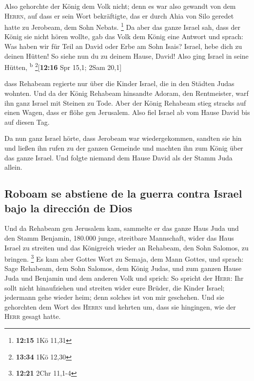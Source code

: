  Also gehorchte der König dem Volk nicht; denn es war
also gewandt von dem \textsc{Herrn}, auf dass er sein Wort bekräftigte,
das er durch Ahia von Silo geredet hatte zu Jerobeam, dem Sohn Nebats.
\footnote{\textbf{12:15} 1Kö 11,31}  Da aber das ganze
Israel sah, dass der König sie nicht hören wollte, gab das Volk dem
König eine Antwort und sprach: Was haben wir für Teil an David oder Erbe
am Sohn Isais? Israel, hebe dich zu deinen Hütten! So siehe nun du zu
deinem Hause, David! Also ging Israel in seine Hütten,
\textsuperscript{b} \footnote{\textbf{13:34} 1Kö 12,30}{[}\textbf{12:16}
Spr 15,1; 2Sam 20,1{]}

 dass Rehabeam regierte nur über die Kinder Israel, die
in den Städten Judas wohnten.  Und da der König Rehabeam
hinsandte Adoram, den Rentmeister, warf ihn ganz Israel mit Steinen zu
Tode. Aber der König Rehabeam stieg stracks auf einen Wagen, dass er
flöhe gen Jerusalem.  Also fiel Israel ab vom Hause David
bis auf diesen Tag.

 Da nun ganz Israel hörte, dass Jerobeam war
wiedergekommen, sandten sie hin und ließen ihn rufen zu der ganzen
Gemeinde und machten ihn zum König über das ganze Israel. Und folgte
niemand dem Hause David als der Stamm Juda allein.

\hypertarget{roboam-se-abstiene-de-la-guerra-contra-israel-bajo-la-direcciuxf3n-de-dios}{%
\subsection{Roboam se abstiene de la guerra contra Israel bajo la
dirección de
Dios}\label{roboam-se-abstiene-de-la-guerra-contra-israel-bajo-la-direcciuxf3n-de-dios}}

 Und da Rehabeam gen Jerusalem kam, sammelte er das ganze
Haus Juda und den Stamm Benjamin, 180.000 junge, streitbare Mannschaft,
wider das Haus Israel zu streiten und das Königreich wieder an Rehabeam,
den Sohn Salomos, zu bringen. \footnote{\textbf{12:21} 2Chr 11,1-4}
 Es kam aber Gottes Wort zu Semaja, dem Mann Gottes, und
sprach:  Sage Rehabeam, dem Sohn Salomos, dem König
Judas, und zum ganzen Hause Juda und Benjamin und dem anderen Volk und
sprich:  So spricht der \textsc{Herr}: Ihr sollt nicht
hinaufziehen und streiten wider eure Brüder, die Kinder Israel;
jedermann gehe wieder heim; denn solches ist von mir geschehen. Und sie
gehorchten dem Wort des \textsc{Herrn} und kehrten um, dass sie
hingingen, wie der \textsc{Herr} gesagt hatte.

